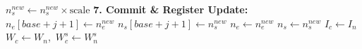 \begin{algorithm}[H]
{{        $n_s^{new} \gets n_s^{new} \times \text{scale}$ 
    }
    \BlankLine
    \textbf{7. Commit \& Register Update:} \\
    $n_e[base + j + 1] \gets n_e^{new}$ 
    $n_s[base + j + 1] \gets n_s^{new}$ 
    $n_e \gets n_e^{new}$ 
    $n_s \gets n_s^{new}$ 
    $I_c \gets I_n$ 
    $W_c \gets W_n$,\ $W_c^{s} \gets W_n^{s}$ 
}
\caption{Two-population plasma rate-equation solver (Part 2/2): sequential trapezoidal time-stepping per radial point.}
\label{alg:rate_kernel_2}
\end{algorithm}

\newpage

